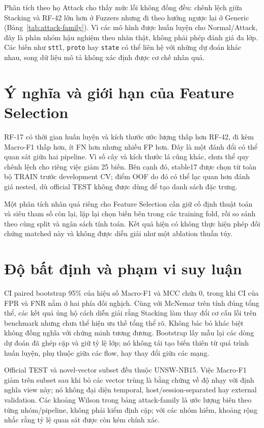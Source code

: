 Phân tích theo họ Attack cho thấy mức lỗi không đồng đều: chênh lệch giữa Stacking và RF-42 lớn hơn ở Fuzzers nhưng đi theo hướng ngược lại ở Generic (Bảng~\ref{tab:attack-family}). Vì các mô hình được huấn luyện cho Normal/Attack, đây là phân nhóm hậu nghiệm theo nhãn thật, không phải phép đánh giá đa lớp. Các biến như \texttt{sttl}, \texttt{proto} hay \texttt{state} có thể liên hệ với những dự đoán khác nhau, song dữ liệu mô tả không xác định được cơ chế nhân quả.

\section{Ý nghĩa và giới hạn của Feature Selection}
\label{sec:discussion-feature-selection}

RF-17 có thời gian huấn luyện và kích thước ước lượng thấp hơn RF-42, đi kèm Macro-F1 thấp hơn, ít FN hơn nhưng nhiều FP hơn. Đây là một đánh đổi có thể quan sát giữa hai pipeline. Vì số cây và kích thước lá cũng khác, chưa thể quy chênh lệch cho riêng việc giảm 25 biến. Bên cạnh đó, stable17 được chọn từ toàn bộ TRAIN trước development CV; điểm OOF do đó có thể lạc quan hơn đánh giá nested, dù official TEST không được dùng để tạo danh sách đặc trưng.

Một phân tích nhân quả riêng cho Feature Selection cần giữ cố định thuật toán và siêu tham số còn lại, lặp lại chọn biến bên trong các training fold, rồi so sánh theo cùng split và ngân sách tính toán. Kết quả hiện có không thực hiện phép đối chứng matched này và không được diễn giải như một ablation thuần túy.

\section{Độ bất định và phạm vi suy luận}
\label{sec:discussion-uncertainty}

CI paired bootstrap 95\% của hiệu số Macro-F1 và MCC chứa 0, trong khi CI của FPR và FNR nằm ở hai phía đối nghịch. Cùng với McNemar trên tính đúng tổng thể, các kết quả ủng hộ cách diễn giải rằng Stacking làm thay đổi cơ cấu lỗi trên benchmark nhưng chưa thể hiện ưu thế tổng thể rõ. Không bác bỏ khác biệt không đồng nghĩa với chứng minh tương đương. Bootstrap lấy mẫu lại các dòng dự đoán đã ghép cặp và giữ tỷ lệ lớp; nó không tái tạo biến thiên từ quá trình huấn luyện, phụ thuộc giữa các flow, hay thay đổi giữa các mạng.

Official TEST và novel-vector subset đều thuộc UNSW-NB15. Việc Macro-F1 giảm trên subset sau khi bỏ các vector trùng là bằng chứng về độ nhạy với định nghĩa view này; nó không đại diện temporal, host/session-separated hay external validation. Các khoảng Wilson trong bảng attack-family là ước lượng biên theo từng nhóm/pipeline, không phải kiểm định cặp; với các nhóm hiếm, khoảng rộng nhắc rằng tỷ lệ quan sát được còn kém chính xác.

